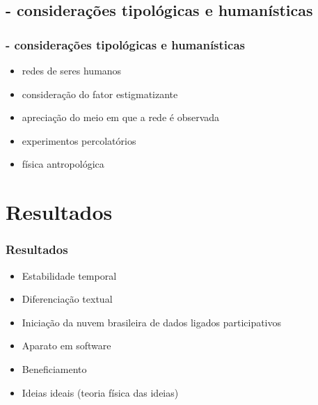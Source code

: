 \documentclass[10pt]{beamer}
\begin{document}
\begin{frame}
\subsection{- considerações tipológicas e humanísticas}
\frametitle{- considerações tipológicas e humanísticas}
\begin{itemize}
	\item redes de seres humanos
	\item consideração do fator estigmatizante
	\item apreciação do meio em que a rede é observada
	\item experimentos percolatórios
	\item física antropológica
\end{itemize}
\end{frame}

\section{Resultados}
\begin{frame}
\frametitle{Resultados}
\begin{itemize}
	\item Estabilidade temporal
	\item Diferenciação textual
	\item Iniciação da nuvem brasileira de dados ligados participativos
	\item Aparato em software
	\item Beneficiamento
	\item Ideias ideais (teoria física das ideias)
\end{itemize}
\end{frame}
\end{document}
